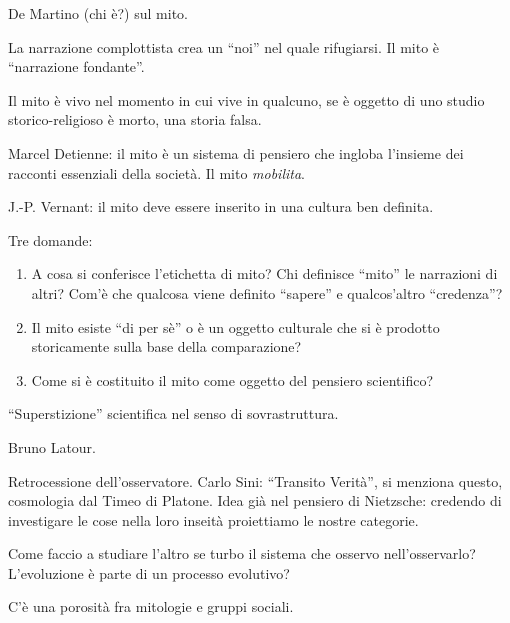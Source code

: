 \documentclass[main.tex]{subfiles}
\begin{document}
De Martino (chi è?) sul mito. 

La narrazione complottista crea un ``noi'' nel quale rifugiarsi. 
Il mito è ``narrazione fondante''. 

Il mito è vivo nel momento in cui vive in qualcuno, se è oggetto di uno studio storico-religioso è morto, una storia falsa.

Marcel Detienne: il mito è un sistema di pensiero che ingloba l'insieme dei racconti essenziali della società. 
Il mito \emph{mobilita}. 

J.-P. Vernant: il mito deve essere inserito in una cultura ben definita.

Tre domande:
\begin{enumerate}
    \item A cosa si conferisce l'etichetta di mito? Chi definisce ``mito'' le narrazioni di altri? Com'è che qualcosa viene definito ``sapere'' e qualcos'altro ``credenza''?
    \item Il mito esiste ``di per sè'' o è un oggetto culturale che si è prodotto storicamente sulla base della comparazione?
    \item Come si è costituito il mito come oggetto del pensiero scientifico? 
\end{enumerate}

``Superstizione'' scientifica nel senso di sovrastruttura. 

Bruno Latour. 

Retrocessione dell'osservatore.
Carlo Sini: ``Transito Verità'', si menziona questo, cosmologia dal Timeo di Platone. 
Idea già nel pensiero di Nietzsche: credendo di investigare le cose nella loro inseità proiettiamo le nostre categorie.

Come faccio a studiare l'altro se turbo il sistema che osservo nell'osservarlo?
L'evoluzione è parte di un processo evolutivo?

C'è una porosità fra mitologie e gruppi sociali.
\end{document}
